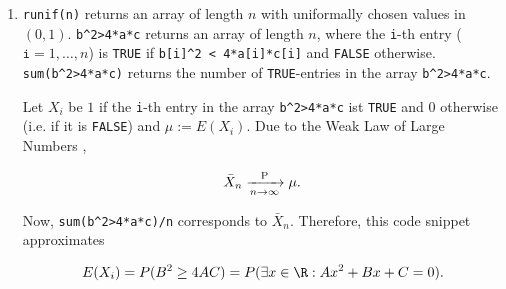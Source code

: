 \begin{solution}
\begin{enumerate}[label = (\alph*)]
\begin{enumerate}[label = \arabic*.]
    \end{enumerate}

    \item \verb|runif(n)| returns an array of length $n$ with uniformally chosen values in $(0, 1)$.
    \verb|b^2>4*a*c| returns an array of length $n$, where the \texttt{i}-th entry ($\texttt{i} = 1, \dots, n$) is \texttt{TRUE} if \verb|b[i]^2 < 4*a[i]*c[i]| and \texttt{FALSE} otherwise.
    \verb|sum(b^2>4*a*c)| returns the number of \texttt{TRUE}-entries in the array \verb|b^2>4*a*c|.

    Let $X_i$ be $1$ if the \texttt{i}-th entry in the array \verb|b^2>4*a*c| ist \texttt{TRUE} and $0$ otherwise (i.e. if it is \texttt{FALSE}) and $\mu := E(X_i)$.
    Due to the Weak Law of Large Numbers \cite[Lecture 4, Slide 52]{EStat},

    \begin{align*}
        \bar X_n \xrightarrow[n \to \infty]{\text P} \mu.
    \end{align*}

    Now, \verb|sum(b^2>4*a*c)/n| corresponds to $\bar X_n$.
    Therefore, this code snippet approximates

    \begin{align*}
        E(X_i)
        =
        P(B^2 \geq 4 A C)
        =
        P(\exists x \in \R: A x^2 + B x + C = 0).
    \end{align*}

\end{enumerate}

\end{solution}

